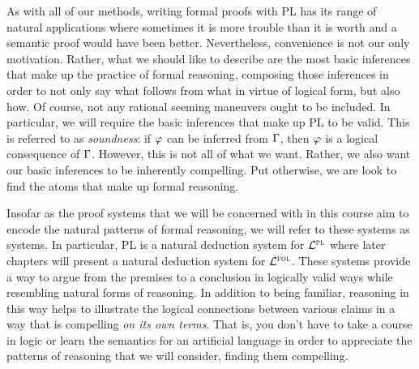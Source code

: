 As with all of our methods, writing formal proofs with PL has its range of natural applications where sometimes it is more trouble than it is worth and a semantic proof would have been better.
Nevertheless, convenience is not our only motivation.
Rather, what we should like to describe are the most basic inferences that make up the practice of formal reasoning, composing those inferences in order to not only say what follows from what in virtue of logical form, but also how. %
Of course, not any rational seeming maneuvers ought to be included.
In particular, we will require the basic inferences that make up PL to be valid.
This is referred to as \textit{soundness}: if $\varphi$ can be inferred from $\Gamma$, then $\varphi$ is a logical consequence of $\Gamma$. 
However, this is not all of what we want.
Rather, we also want our basic inferences to be inherently compelling.
Put otherwise, we are look to find the atoms that make up formal reasoning.

Insofar as the proof systems that we will be concerned with in this course aim to encode the natural patterns of formal reasoning, we will refer to these systems as  systems.
In particular, PL is a natural deduction system for $\mathcal{L}^{\textsc{pl}}$ where later chapters will present a natural deduction system for $\mathcal{L}^{\textsc{fol}}$.
These systems provide a way to argue from the premises to a conclusion in logically valid ways while resembling natural forms of reasoning.
In addition to being familiar, reasoning in this way helps to illustrate the logical connections between various claims in a way that is compelling \textit{on its own terms}.
That is, you don't have to take a course in logic or learn the semantics for an artificial language in order to appreciate the patterns of reasoning that we will consider, finding them compelling.

